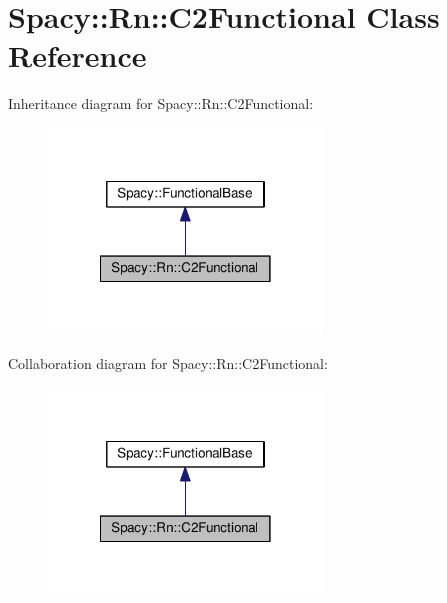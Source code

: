 \hypertarget{classSpacy_1_1Rn_1_1C2Functional}{\section{Spacy\-:\-:Rn\-:\-:C2\-Functional Class Reference}
\label{classSpacy_1_1Rn_1_1C2Functional}
}


Inheritance diagram for Spacy\-:\-:Rn\-:\-:C2\-Functional\-:
\nopagebreak
\begin{figure}[H]
\begin{center}
\leavevmode
\includegraphics[width=206pt]{classSpacy_1_1Rn_1_1C2Functional__inherit__graph}
\end{center}
\end{figure}


Collaboration diagram for Spacy\-:\-:Rn\-:\-:C2\-Functional\-:
\nopagebreak
\begin{figure}[H]
\begin{center}
\leavevmode
\includegraphics[width=206pt]{classSpacy_1_1Rn_1_1C2Functional__coll__graph}
\end{center}
\end{figure}
